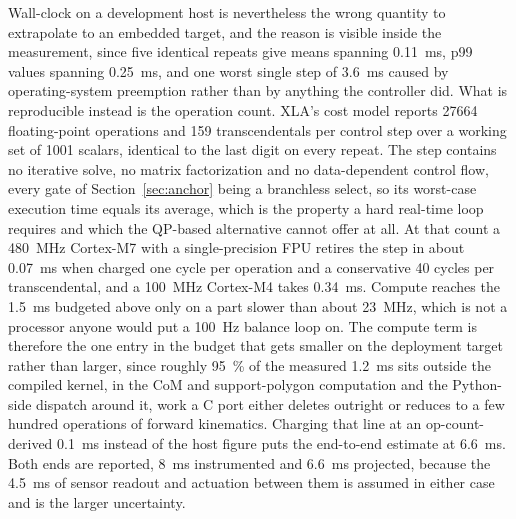 \documentclass[a4paper,fleqn]{cas-dc}
\begin{document}
Wall-clock on a development host is nevertheless the wrong quantity to
extrapolate to an embedded target, and the reason is visible inside the
measurement, since five identical repeats give means spanning \SI{0.11}{ms}, p99
values spanning \SI{0.25}{ms}, and one worst single step of \SI{3.6}{ms} caused
by operating-system preemption rather than by anything the controller did. What
is reproducible instead is the operation count. XLA's cost model reports
\num{27664} floating-point operations and \num{159} transcendentals per control
step over a working set of \num{1001} scalars, identical to the last digit on
every repeat. The step contains no iterative solve, no matrix factorization and
no data-dependent control flow, every gate of Section~\ref{sec:anchor} being a
branchless select, so its worst-case execution time equals its average, which is
the property a hard real-time loop requires and which the QP-based alternative
cannot offer at all. At that count a \SI{480}{MHz} Cortex-M7 with a
single-precision FPU retires the step in about \SI{0.07}{ms} when charged one
cycle per operation and a conservative \num{40} cycles per transcendental, and a
\SI{100}{MHz} Cortex-M4 takes \SI{0.34}{ms}. Compute reaches the \SI{1.5}{ms}
budgeted above only on a part slower than about \SI{23}{MHz}, which is not a
processor anyone would put a \SI{100}{Hz} balance loop on. The compute term is
therefore the one entry in the budget that gets smaller on the deployment target
rather than larger, since roughly \SI{95}{\percent} of the measured
\SI{1.2}{ms} sits outside the compiled kernel, in the CoM and support-polygon
computation and the Python-side dispatch around it, work a C port either deletes
outright or reduces to a few hundred operations of forward kinematics. Charging
that line at an op-count-derived \SI{0.1}{ms} instead of the host figure puts
the end-to-end estimate at \SI{6.6}{ms}. Both ends are reported, \SI{8}{ms}
instrumented and \SI{6.6}{ms} projected, because the \SI{4.5}{ms} of sensor
readout and actuation between them is assumed in either case and is the larger
uncertainty.
\end{document}
